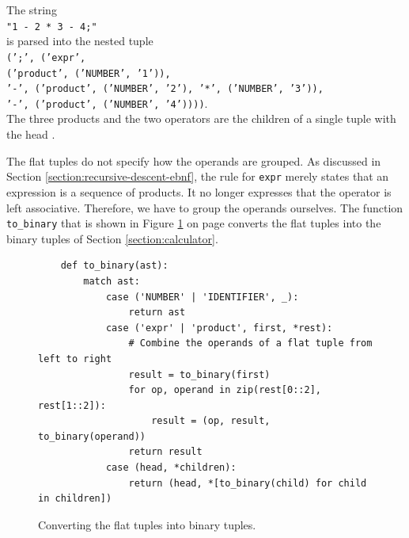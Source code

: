 \exampleEng
The string
\\[0.2cm]
\hspace*{1.3cm}
\texttt{"1 - 2 * 3 - 4;"}
\\[0.2cm]
is parsed into the nested tuple
\\[0.2cm]
\hspace*{0.3cm}
\texttt{(';', ('expr',}
\\
\hspace*{0.8cm}
\texttt{('product', ('NUMBER', '1')),}
\\
\hspace*{0.8cm}
\texttt{'-', ('product', ('NUMBER', '2'), '*', ('NUMBER', '3')),}
\\
\hspace*{0.8cm}
\texttt{'-', ('product', ('NUMBER', '4'))))}.
\\[0.2cm]
The three products and the two operators are the children of a single tuple with the head . \eox

\noindent
The flat tuples do not specify how the operands are grouped.  As discussed in Section
\ref{section:recursive-descent-ebnf}, the  rule for \texttt{expr} merely states that an expression
is a sequence of products.  It no longer expresses that the operator \squoted{-} is left associative.
Therefore, we have to group the operands ourselves.  The function \texttt{to\_binary} that is shown in
Figure \ref{fig:01-Calculator-EBNF.ipynb:to_binary} on page \pageref{fig:01-Calculator-EBNF.ipynb:to_binary}
converts the flat tuples into the binary tuples of Section \ref{section:calculator}.

\begin{figure}[!ht]
\centering
\begin{verbatim}
    def to_binary(ast):
        match ast:
            case ('NUMBER' | 'IDENTIFIER', _):
                return ast
            case ('expr' | 'product', first, *rest):
                # Combine the operands of a flat tuple from left to right
                result = to_binary(first)
                for op, operand in zip(rest[0::2], rest[1::2]):
                    result = (op, result, to_binary(operand))
                return result
            case (head, *children):
                return (head, *[to_binary(child) for child in children])
\end{verbatim}
\vspace*{-0.3cm}
\caption{Converting the flat tuples into binary tuples.}
\label{fig:01-Calculator-EBNF.ipynb:to_binary}
\end{figure}

